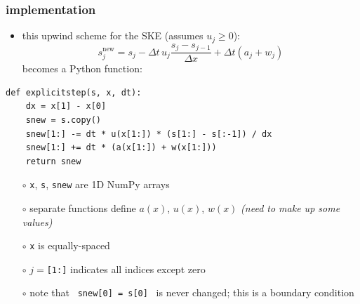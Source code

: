 \documentclass[10pt,dvipsnames]{beamer}
\newcommand{\snew}{s^{\text{new}}}
\newcommand{\comm}[1]{{\footnotesize \hfill \emph{#1}}}
\begin{document}
\begin{frame}[fragile]\frametitle{implementation}

\begin{itemize}
\item this upwind scheme for the SKE (assumes $u_j \ge 0$):
    $$\snew_j = s_j - \Delta t\, u_j \frac{s_j-s_{j-1}}{\Delta x} + \Delta t (a_j + w_j)$$
becomes a Python function:
\end{itemize}
\begin{lstlisting}[language=PythonPlus]
def explicitstep(s, x, dt):
    dx = x[1] - x[0]
    snew = s.copy()
    snew[1:] -= dt * u(x[1:]) * (s[1:] - s[:-1]) / dx
    snew[1:] += dt * (a(x[1:]) + w(x[1:]))
    return snew
\end{lstlisting}

\vspace{-2mm}
{\footnotesize
    \begin{itemize}
    \item[$\circ$] \texttt{x}, \texttt{s}, \texttt{snew} are 1D NumPy arrays
    \item[$\circ$] separate functions define $a(x)$, $u(x)$, $w(x)$ \comm{(need to make up some values)}
    \item[$\circ$] \texttt{x} is equally-spaced
    \item[$\circ$] $j=$\texttt{[1:]} indicates all indices except zero
    \item[$\circ$] note that \, \texttt{snew[0] = s[0]} \, is never changed; this is a boundary condition
    \end{itemize}
}
\end{frame}
\end{document}
